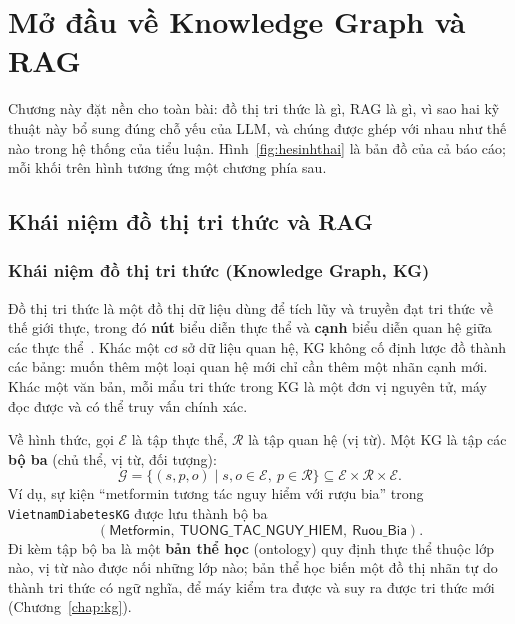 \chapter{Mở đầu về Knowledge Graph và RAG}\label{chap:mo-dau}

Chương này đặt nền cho toàn bài: đồ thị tri thức là gì, RAG là gì, vì sao hai kỹ thuật này bổ sung đúng chỗ yếu
của LLM, và chúng được ghép với nhau như thế nào trong hệ thống của tiểu luận. Hình~\ref{fig:hesinhthai} là bản đồ
của cả báo cáo; mỗi khối trên hình tương ứng một chương phía sau.


\section{Khái niệm đồ thị tri thức và RAG}

\subsection{Khái niệm đồ thị tri thức (Knowledge Graph, KG)}
Đồ thị tri thức là một đồ thị dữ liệu dùng để tích lũy và truyền đạt tri thức về thế giới thực, trong đó
\textbf{nút} biểu diễn thực thể và \textbf{cạnh} biểu diễn quan hệ giữa các thực thể~\cite{hogan2021kg}. Khác một
cơ sở dữ liệu quan hệ, KG không cố định lược đồ thành các bảng: muốn thêm một loại quan hệ mới chỉ cần thêm một
nhãn cạnh mới. Khác một văn bản, mỗi mẩu tri thức trong KG là một đơn vị nguyên tử, máy đọc được và có thể truy
vấn chính xác.

Về hình thức, gọi $\mathcal{E}$ là tập thực thể, $\mathcal{R}$ là tập quan hệ (vị từ). Một KG là tập các
\textbf{bộ ba} (chủ thể, vị từ, đối tượng):
\begin{equation}
  \mathcal{G} = \{ (s, p, o) \mid s, o \in \mathcal{E},\ p \in \mathcal{R} \} \subseteq \mathcal{E} \times \mathcal{R} \times \mathcal{E}.
  \label{eq:kg}
\end{equation}
Ví dụ, sự kiện ``metformin tương tác nguy hiểm với rượu bia'' trong \texttt{VietnamDiabetesKG} được lưu thành bộ
ba
\[
  (\textsf{Metformin},\ \textsf{TUONG\_TAC\_NGUY\_HIEM},\ \textsf{Ruou\_Bia}).
\]
Đi kèm tập bộ ba là một
\textbf{bản thể học} (ontology) quy định thực thể thuộc lớp nào, vị từ nào được nối những lớp nào; bản thể học
biến một đồ thị nhãn tự do thành tri thức có ngữ nghĩa, để máy kiểm tra được và suy ra được tri thức mới
(Chương~\ref{chap:kg}).

